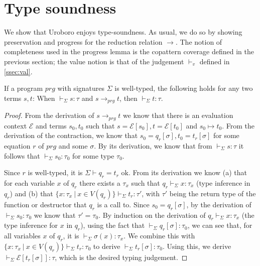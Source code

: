 \section{Type soundness}
\label{sec:urots}

We show that Uroboro enjoys type-soundness. As usual, we do so by showing preservation and progress for the reduction relation $\longrightarrow$. The notion of completeness used in the progress lemma is the copattern coverage defined in the previous section; the value notion is that of the judgement $\vdash_v$ defined in \autoref{ssec:val}.

\begin{lemma}
If a program $prg$ with signatures $\Sigma$ is well-typed, the following holds for any two terms $s, t$: When $\vdash_{\Sigma} s : \tau$ and $s \longrightarrow_{prg} t$, then $\vdash_{\Sigma} t : \tau$.
\begin{proof}
From the derivation of $s \longrightarrow_{prg} t$ we know that there is an evaluation context $\mathcal{E}$ and terms $s_0, t_0$ such that $s = \mathcal{E}[s_0], t = \mathcal{E}[t_0]$ and $s_0 \mapsto t_0$. From the derivation of the contraction, we know that $s_0 = q_r[\sigma], t_0 = t_r[\sigma]$ for some equation $r$ of $prg$ and some $\sigma$.  By its derivation, we know that from $\vdash_{\Sigma} s : \tau$ it follows that $\vdash_{\Sigma} s_0 : \tau_0$ for some type $\tau_0$.

Since $r$ is well-typed, it is $\Sigma \vdash q_r = t_r \textrm{ ok}$. From its derivation we know (a) that for each variable $x$ of $q_r$ there exists a $\tau_x$ such that $q_r \vdash_{\Sigma} x : \tau_x$ (type inference in $q_r$) and (b) that $\{ x : \tau_x ~ | ~ x \in V(q_r) \} \vdash_{\Sigma} t_r : \tau'$, with $\tau'$ being the return type of the function or destructor that $q_r$ is a call to. Since $s_0 = q_r[\sigma]$, by the derivation of $\vdash_{\Sigma} s_0 : \tau_0$ we know that $\tau' = \tau_0$. By induction on the derivation of $q_r \vdash_{\Sigma} x : \tau_x$ (the type inference for $x$ in $q_r$), using the fact that $\vdash_{\Sigma} q_r[\sigma]: \tau_0$, we can see that, for all variables $x$ of $q_r$, it is $\vdash_{\Sigma} \sigma(x) : \tau_x$. We combine this with $\{ x : \tau_x ~ | ~ x \in V(q_r) \} \vdash_{\Sigma} t_r : \tau_0$ to derive $\vdash_{\Sigma} t_r[\sigma] : \tau_0$. Using this, we derive $\vdash_{\Sigma} \mathcal{E}[t_r[\sigma]] : \tau$, which is the desired typing judgement.
\end{proof}
\end{lemma}

